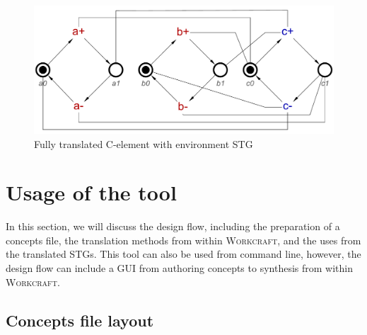 \documentclass[british,conference,compsoc]{IEEEtran}
\newcommand{\noun}[1]{\textsc{#1}}
\begin{document}
\begin{figure}[h]
\vspace{-4mm}
\begin{centering}
\includegraphics[scale=0.3]{Images/cElement-stg-translated}
\par\end{centering}
\protect\caption{\label{fig:cElement-stg-translated} Fully translated C-element with environment STG}
\vspace{-3mm}
\end{figure}

\vspace{-3mm}

\section{Usage of the tool\label{sec:tool-use}}

\vspace{-2mm}

In this section, we will discuss the design flow, including the preparation of 
a concepts file, the translation methods from within \noun{Workcraft}, and 
the uses from the translated STGs. This tool can also be used from command line,
however, the design flow can include a GUI from authoring concepts to synthesis
from within \noun{Workcraft}. 

\vspace{-3mm}

\subsection{Concepts file layout \label{sub:file_layout}}

\vspace{-3mm}
\end{document}

